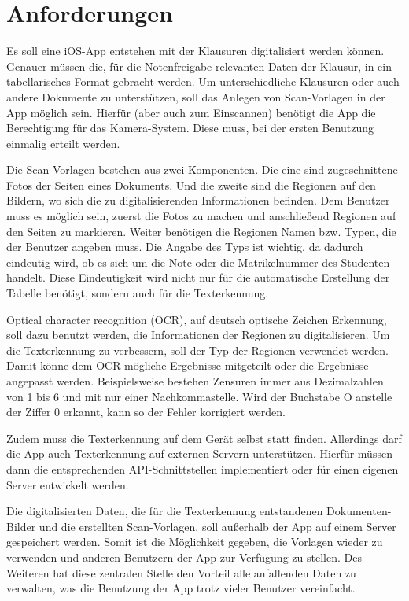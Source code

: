 \documentclass[nomenclature, 150]{HSMW-Thesis}
\begin{document}
\chapter{Anforderungen}
	Es soll eine iOS-App entstehen mit der Klausuren digitalisiert werden können. Genauer müssen die, für die Notenfreigabe relevanten Daten der Klausur, in ein tabellarisches Format gebracht werden. Um unterschiedliche Klausuren oder auch andere Dokumente zu unterstützen, soll das Anlegen von Scan-Vorlagen in der App möglich sein. Hierfür (aber auch zum Einscannen) benötigt die App die Berechtigung für das Kamera-System. Diese muss, bei der ersten Benutzung einmalig erteilt werden.
	
	Die Scan-Vorlagen bestehen aus zwei Komponenten. Die eine sind zugeschnittene Fotos der Seiten eines Dokuments. Und die zweite sind die Regionen auf den Bildern, wo sich die zu digitalisierenden Informationen befinden. Dem Benutzer muss es möglich sein, zuerst die Fotos zu machen und anschließend Regionen auf den Seiten zu markieren. Weiter benötigen die Regionen Namen bzw. Typen, die der Benutzer angeben muss. Die Angabe des Typs ist wichtig, da dadurch eindeutig wird, ob es sich um die Note oder die Matrikelnummer des Studenten handelt. Diese Eindeutigkeit wird nicht nur für die automatische Erstellung der Tabelle benötigt, sondern auch für die Texterkennung. 
	
	Optical character recognition (OCR), auf deutsch optische Zeichen Erkennung, soll dazu benutzt werden, die Informationen der Regionen zu digitalisieren. Um die Texterkennung zu verbessern, soll der Typ der Regionen verwendet werden. Damit könne dem OCR mögliche Ergebnisse mitgeteilt oder die Ergebnisse angepasst werden. Beispielsweise bestehen Zensuren immer aus Dezimalzahlen von 1 bis 6 und mit nur einer Nachkommastelle. Wird der Buchstabe O anstelle der Ziffer 0 erkannt, kann so der Fehler korrigiert werden.
	
	Zudem muss die Texterkennung auf dem Gerät selbst statt finden. Allerdings darf die App auch Texterkennung auf externen Servern unterstützen. Hierfür müssen dann die entsprechenden API-Schnittstellen implementiert oder für einen eigenen Server entwickelt werden.

	Die digitalisierten Daten, die für die Texterkennung entstandenen Dokumenten-Bilder und die erstellten Scan-Vorlagen, soll außerhalb der App auf einem Server gespeichert werden. Somit ist die Möglichkeit gegeben, die Vorlagen wieder zu verwenden und anderen Benutzern der App zur Verfügung zu stellen. Des Weiteren hat diese zentralen Stelle den Vorteil alle anfallenden Daten zu verwalten, was die Benutzung der App trotz vieler Benutzer vereinfacht.
	
\end{document}
